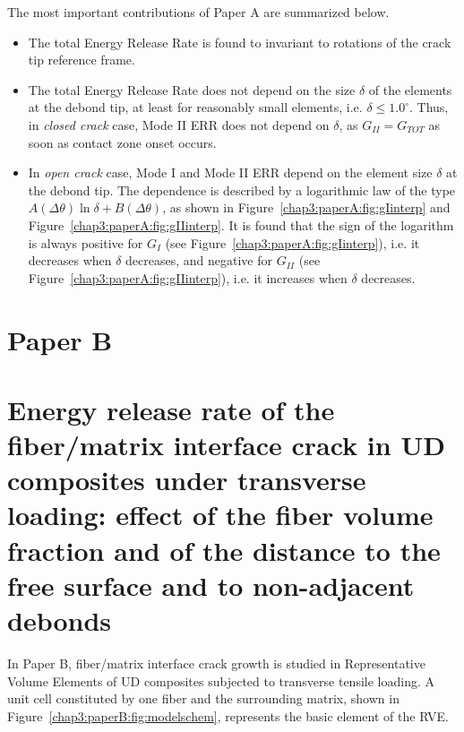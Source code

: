 The most important contributions of Paper A are summarized below.
\begin{itemize}
\item The total Energy Release Rate is found to invariant to rotations of the crack tip reference frame.
\item The total Energy Release Rate does not depend on the size $\delta$ of the elements at the debond tip, at least for reasonably small elements, i.e. $\delta\leq1.0^{\circ}$. Thus, in \emph{closed crack} case, Mode II ERR does not depend on $\delta$, as $G_{II}=G_{TOT}$ as soon as contact zone onset occurs.
\item In \emph{open crack} case, Mode I and Mode II ERR depend on the element size $\delta$ at the debond tip. The dependence is described by a logarithmic law of the type $A\left(\Delta\theta\right)\ln\delta+B\left(\Delta\theta\right)$, as shown in Figure~\ref{chap3:paperA:fig:gIinterp} and Figure~\ref{chap3:paperA:fig:gIIinterp}. It is found that the sign of the logarithm is always positive for $G_{I}$ (see Figure~\ref{chap3:paperA:fig:gIinterp}), i.e. it decreases when $\delta$ decreases, and negative for $G_{II}$ (see Figure~\ref{chap3:paperA:fig:gIIinterp}), i.e. it increases when $\delta$ decreases.
\end{itemize}


\section{Paper B}\label{chap3:paperB}
\section*{Energy release rate of the fiber/matrix interface crack in UD composites under transverse loading: effect of the fiber volume fraction and of the distance to the free surface and to non-adjacent debonds}

In Paper B, fiber/matrix interface crack growth is studied in Representative Volume Elements of UD composites subjected to transverse tensile loading. A unit cell constituted by one fiber and the surrounding matrix, shown in Figure~\ref{chap3:paperB:fig:modelschem}, represents the basic element of the RVE.

